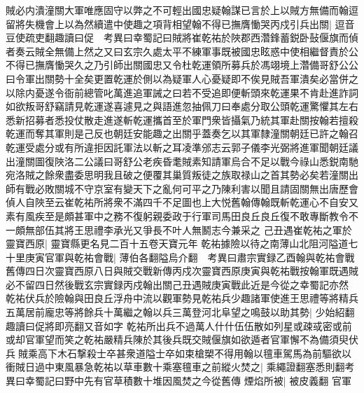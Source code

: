 賊必内潰潼關大軍唯應固守以弊之不可輕出國忠疑翰謀已言於上以賊方無備而翰逗留將失機會上以為然續遣中使趣之項背相望翰不得已撫膺慟哭丙戍引兵出關|{
	逗音豆使疏吏翻趣讀曰促　考異曰幸蜀記曰賊將崔乾祐於陜郡西濳鋒蓄鋭卧鼔偃旗而偵者奏云賊全無備上然之又曰玄宗久處太平不練軍事既被國忠眩惑中使相繼督責於公不得已撫膺慟哭久之乃引師出關國忠又令杜乾運領所募兵於馮翊境上濳備哥舒公公曰令軍出關勢十全矣更置乾運於側以為疑軍人心憂疑即不俟見賊吾軍潰矣必當併之以除内憂遂令衙前總管叱萬進追軍誡之曰若不受追即便斬頭來乾運果不肯赴進詐詞如欲叛哥舒竊請見乾運遂喜遽見之與語進忽抽佩刀曰奉處分取公頭乾運驚懼其左右悉新招募者悉投仗散走進遂斬乾運攜首至於軍門衆皆攝氣乃統其軍赴關按翰若擅殺乾運而奪其軍則是己反也朝廷安能趣之出關乎蓋奏乞以其軍隸潼關朝廷已許之翰召乾運受處分或有所違拒因託軍法以斬之耳凌準邠志云郭子儀李光弼將進軍聞朝廷議出潼關圖復陜洛二公議曰哥舒公老疾昏耄賊素知請軍烏合不足以戰今祿山悉鋭南馳宛洛賊之餘衆盡委思明我且破之便覆其巢質叛徒之族取禄山之首其勢必矣若潼關出師有戰必敗關城不守京室有變天下之亂何可平之乃陳利害以聞且請固關無出唐歷會偵人自陜至云崔乾祐所將衆不滿四千不足圖也上大悦舊翰傳翰既斬乾運心不自安又素有風疾至是頗甚軍中之務不復躬親委政于行軍司馬田良丘良丘復不敢專斷教令不一頗無部伍其將王思禮李承光又爭長不叶人無鬭志今兼采之}
己丑遇崔乾祐之軍於靈寶西原|{
	靈寶縣更名見二百十五卷天寶元年}
乾祐據險以待之南薄山北阻河隘道七十里庚寅官軍與乾祐會戰|{
	薄伯各翻隘烏介翻　考異曰肅宗實録乙酉翰與乾祐會戰舊傳四日次靈寶西原八日與賊交戰新傳丙戍次靈寶西原庚寅與乾祐戰按翰軍既遇賊必不留四日然後戰玄宗實録丙戍翰出關己丑遇賊庚寅戰此近是今從之幸蜀記亦然}
乾祐伏兵於險翰與田良丘浮舟中流以觀軍勢見乾祐兵少趣諸軍使進王思禮等將精兵五萬居前龐忠等將餘兵十萬繼之翰以兵三萬登河北阜望之鳴鼓以助其勢|{
	少始紹翻趣讀曰促將即亮翻又音如字}
乾祐所出兵不過萬人什什伍伍散如列星或疎㦯密或前或却官軍望而笑之乾祐嚴精兵陳於其後兵既交賊偃旗如欲遁者官軍懈不為備須臾伏兵賊乘高下木石撃殺士卒甚衆道隘士卒如束槍槊不得用翰以氊車駕馬為前驅欲以衝賊日過中東風暴急乾祐以草車數十乘塞氊車之前縱火焚之|{
	乘繩證翻塞悉則翻考異曰幸蜀記曰野中先有官草積數十堆因風焚之今從舊傳}
煙焰所被|{
	被皮義翻}
官軍


